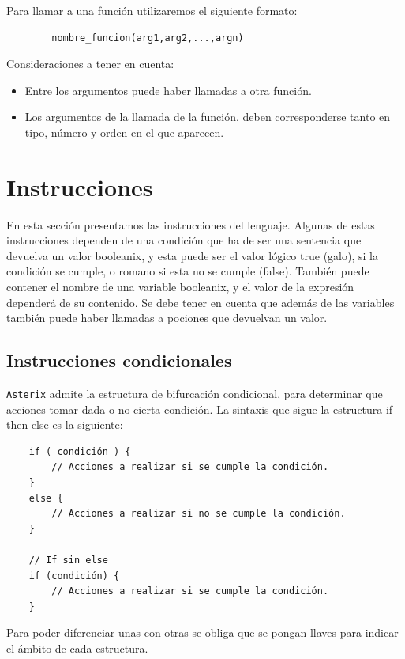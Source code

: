 \documentclass[a4paper, 9pt]{article}
\newcommand{\atx}{\texttt{Asterix} }
\begin{document}
    Para llamar a una función utilizaremos el siguiente formato:
    \begin{verbatim}
        nombre_funcion(arg1,arg2,...,argn)
    \end{verbatim}
    
    Consideraciones a tener en cuenta:
    \begin{itemize}
        \item Entre los argumentos puede haber llamadas a otra función.
        \item Los argumentos de la llamada de la función, deben corresponderse
            tanto en tipo, número y orden en el que aparecen.
    \end{itemize}

    \section*{Instrucciones}
    En esta sección presentamos las instrucciones del lenguaje. Algunas de estas
    instrucciones dependen de una condición que ha de ser una sentencia que
    devuelva un valor booleanix, y esta puede ser el valor lógico true (galo),
    si la condición se cumple, o romano si esta no se cumple (false). También
    puede contener el nombre de una variable booleanix, y el valor de la
    expresión dependerá de su contenido. Se debe tener en cuenta que además de
    las variables también puede haber llamadas a pociones que devuelvan un
    valor.

    \subsection*{Instrucciones condicionales}
    \atx admite la estructura de bifurcación condicional, para determinar que
    acciones tomar dada o no cierta condición. La sintaxis que sigue la
    estructura if-then-else es la siguiente:
    
    \begin{verbatim}
    if ( condición ) { 
        // Acciones a realizar si se cumple la condición.
    }
    else {
        // Acciones a realizar si no se cumple la condición.
    }

    // If sin else
    if (condición) {
        // Acciones a realizar si se cumple la condición.
    }
    \end{verbatim}
    
    Para poder diferenciar unas con otras se obliga que se pongan llaves para
    indicar el ámbito de cada estructura.
\end{document}
